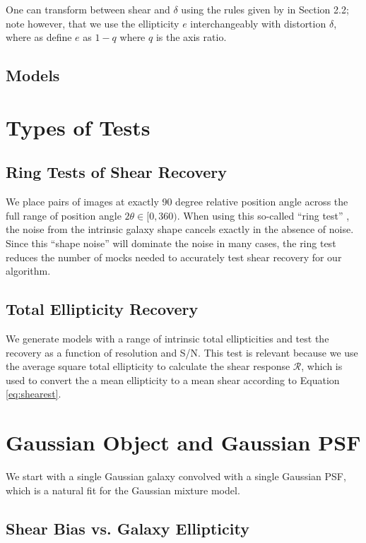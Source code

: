 \documentclass[12pt,preprint]{aastex}
\newcommand{\psf}{PSF}
\newcommand{\Rshear}{\ensuremath{\mathcal{R}}}
\begin{document}
One can transform between shear and $\delta$ using the rules given by
\citet{bern02} in Section 2.2; note however, that we use the ellipticity 
$e$ interchangeably with distortion $\delta$, where as \citet{bern02} define
$e$ as $1-q$ where $q$ is the axis ratio.

\subsection{Models}

\section{Types of Tests}

\subsection{Ring Tests of Shear Recovery}

We place pairs of images at exactly 90 degree relative position angle across
the full range of position angle $2 \theta \in [0,360)$.  When using this
so-called ``ring test'' \citep{Nakajima2007}, the noise from the intrinsic
galaxy shape cancels exactly in the absence of noise.  Since this ``shape
noise'' will dominate the noise in many cases, the ring test reduces the number
of mocks needed to accurately test shear recovery for our algorithm.

\subsection{Total Ellipticity Recovery}

We generate models with a range of intrinsic total ellipticities and test the
recovery as a function of resolution and S/N.  This test is relevant because we
use the average square total ellipticity to calculate the shear response
\Rshear, which is used to convert the a mean ellipticity to a
mean shear according to Equation \ref{eq:shearest}.

\section{Gaussian Object and Gaussian \psf}

We start with a single Gaussian galaxy convolved with a single Gaussian \psf,
which is a natural fit for the Gaussian mixture model.  

\subsection{Shear Bias vs. Galaxy Ellipticity}
\end{document}
